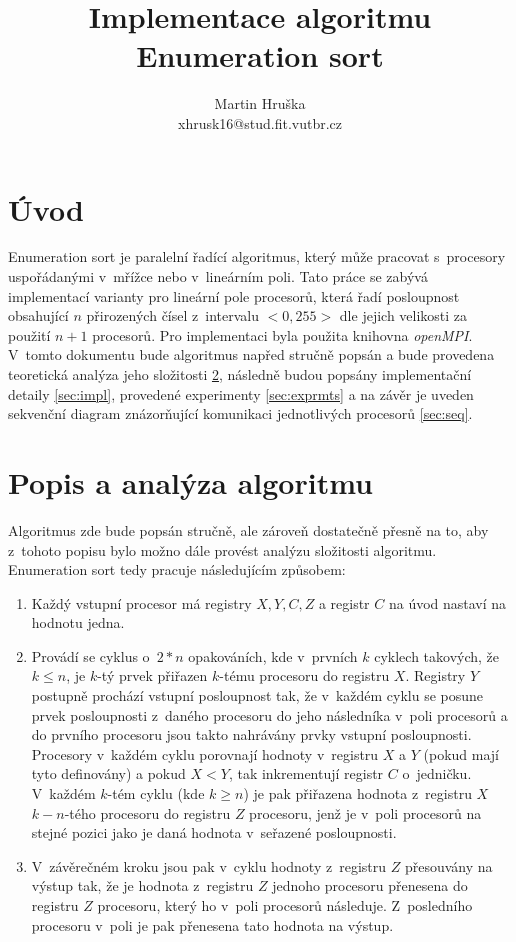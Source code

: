\documentclass[a4paper, 12pt]{article}
\title{Implementace algoritmu Enumeration sort}
\author{Martin Hruška\\xhrusk16@stud.fit.vutbr.cz}
\date{}
\begin{document}
\maketitle

\section{Úvod}
\label{sec:intro}
Enumeration sort je paralelní řadící algoritmus, který může pracovat s~procesory uspořádanými v~mřížce nebo v~lineárním poli.
Tato práce se zabývá implementací varianty pro lineární pole procesorů, která řadí
posloupnost obsahující $n$ přirozených čísel z~intervalu $<0,255>$ dle jejich velikosti za použití $n+1$ procesorů.
Pro implementaci byla použita knihovna \emph{openMPI}.
V~tomto dokumentu bude algoritmus napřed
stručně popsán a bude provedena teoretická analýza jeho složitosti \ref{sec:analysis},
následně budou popsány implementační detaily \ref{sec:impl},
provedené experimenty \ref{sec:exprmts}
a na závěr je uveden sekvenční diagram znázorňující komunikaci jednotlivých procesorů \ref{sec:seq}.

\section{Popis a analýza algoritmu}
\label{sec:analysis}
Algoritmus zde bude popsán stručně,
ale zároveň dostatečně přesně na to, aby z~tohoto popisu bylo možno dále provést analýzu složitosti algoritmu.
Enumeration sort tedy pracuje následujícím způsobem:
\begin{enumerate}
\item Každý vstupní procesor má registry $X, Y, C, Z$ a registr $C$ na úvod nastaví
na hodnotu jedna.
\item Provádí se cyklus o~$2*n$ opakováních, kde v~prvních $k$ cyklech takových, že $k\leq n$,
je $k$-tý prvek přiřazen $k$-tému procesoru do registru $X$.
Registry $Y$ postupně prochází vstupní posloupnost tak, že v~každém cyklu se posune prvek posloupnosti z~daného procesoru
do jeho následníka v~poli procesorů a do prvního procesoru jsou takto nahrávány prvky vstupní posloupnosti.
Procesory v~každém cyklu porovnají hodnoty v~registru $X$ a $Y$ (pokud mají tyto definovány)
a pokud $X < Y$, tak inkrementují registr $C$ o~jedničku.
V~každém $k$-tém cyklu (kde $k \geq n$) je pak přiřazena hodnota z~registru $X$ $k-n$-tého procesoru do registru $Z$ procesoru,
jenž je v~poli procesorů na stejné pozici jako je daná hodnota v~seřazené posloupnosti.
\item V~závěrečném kroku jsou pak v~cyklu hodnoty z~registru $Z$ přesouvány na výstup tak, že je hodnota
z~registru $Z$ jednoho procesoru přenesena do registru $Z$ procesoru, který ho v~poli procesorů následuje.
Z~posledního procesoru v~poli je pak přenesena tato hodnota na výstup.
\end{enumerate}
\end{document}
